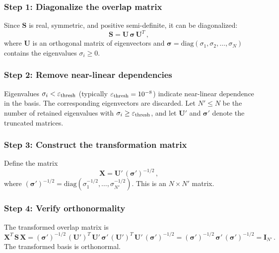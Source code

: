 \subsubsection{Step 1: Diagonalize the overlap matrix}

Since $\mathbf{S}$ is real, symmetric, and positive semi-definite, it can be diagonalized:
\begin{equation}
  \mathbf{S} = \mathbf{U}\,\bm{\sigma}\,\mathbf{U}^T\,,
\end{equation}
where $\mathbf{U}$ is an orthogonal matrix of eigenvectors and
$\bm{\sigma} = \text{diag}(\sigma_1, \sigma_2, \ldots, \sigma_N)$
contains the eigenvalues $\sigma_i \geq 0$.

\subsubsection{Step 2: Remove near-linear dependencies}

Eigenvalues $\sigma_i < \varepsilon_{\text{thresh}}$ (typically $\varepsilon_{\text{thresh}} = 10^{-8}$)
indicate near-linear dependence in the basis. The corresponding eigenvectors are
discarded. Let $N' \leq N$ be the number of retained eigenvalues with
$\sigma_i \geq \varepsilon_{\text{thresh}}$, and let $\mathbf{U}'$ and $\bm{\sigma}'$
denote the truncated matrices.

\subsubsection{Step 3: Construct the transformation matrix}

Define the matrix
\begin{equation}
  \mathbf{X} = \mathbf{U}'\,(\bm{\sigma}')^{-1/2}\,,
\end{equation}
where $(\bm{\sigma}')^{-1/2} = \text{diag}(\sigma_1^{-1/2}, \ldots, \sigma_{N'}^{-1/2})$.
This is an $N \times N'$ matrix.

\subsubsection{Step 4: Verify orthonormality}

The transformed overlap matrix is
\begin{equation}
  \mathbf{X}^T\,\mathbf{S}\,\mathbf{X}
  = (\bm{\sigma}')^{-1/2}\,(\mathbf{U}')^T\,\mathbf{U}'\,\bm{\sigma}'\,(\mathbf{U}')^T\,\mathbf{U}'\,(\bm{\sigma}')^{-1/2}
  = (\bm{\sigma}')^{-1/2}\,\bm{\sigma}'\,(\bm{\sigma}')^{-1/2}
  = \mathbf{I}_{N'}\,.
\end{equation}
The transformed basis is orthonormal.

